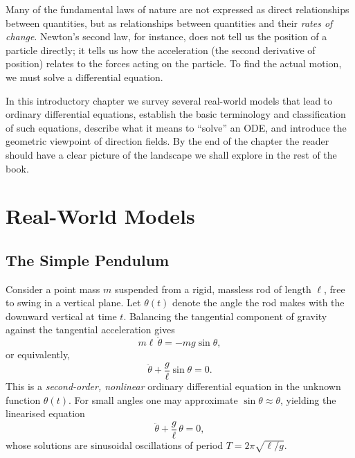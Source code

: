 \documentclass[12pt,a4paper,openany]{book}
\theoremstyle{definition}
\theoremstyle{plain}
\theoremstyle{remark}
\begin{document}
Many of the fundamental laws of nature are not expressed as direct relationships between quantities, but as relationships between quantities and their \emph{rates of change}. Newton's second law, for instance, does not tell us the position of a particle directly; it tells us how the acceleration (the second derivative of position) relates to the forces acting on the particle. To find the actual motion, we must solve a differential equation.


In this introductory chapter we survey several real-world models that lead to ordinary differential equations, establish the basic terminology and classification of such equations, describe what it means to ``solve'' an ODE, and introduce the geometric viewpoint of direction fields. By the end of the chapter the reader should have a clear picture of the landscape we shall explore in the rest of the book.

\section{Real-World Models}
\label{sec:models}

\subsection{The Simple Pendulum}
\label{subsec:pendulum}

Consider a point mass $m$ suspended from a rigid, massless rod of length $\ell$, free to swing in a vertical plane. Let $\theta(t)$ denote the angle the rod makes with the downward vertical at time $t$. Balancing the tangential component of gravity against the tangential acceleration gives
\begin{equation}\label{eq:pendulum}
  m\ell\,\ddot{\theta} = -mg\sin\theta,
\end{equation}
or equivalently,
\begin{equation}\label{eq:pendulum-standard}
  \ddot{\theta} + \frac{g}{\ell}\sin\theta = 0.
\end{equation}
This is a \emph{second-order, nonlinear} ordinary differential equation in the unknown function $\theta(t)$. For small angles one may approximate $\sin\theta\approx\theta$, yielding the linearised equation
\begin{equation}\label{eq:pendulum-linear}
  \ddot{\theta} + \frac{g}{\ell}\,\theta = 0,
\end{equation}
whose solutions are sinusoidal oscillations of period $T = 2\pi\sqrt{\ell/g}$.
\end{document}
